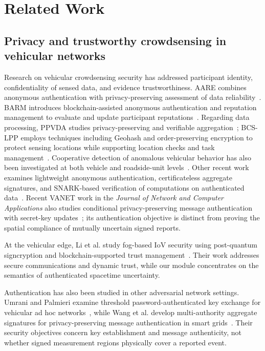 \section{Related Work}
\subsection{Privacy and trustworthy crowdsensing in vehicular networks}
Research on vehicular crowdsensing security has addressed participant identity, confidentiality of sensed data, and evidence trustworthiness. AARE combines anonymous authentication with privacy-preserving assessment of data reliability~\citep{Cheng2023}. BARM introduces blockchain-assisted anonymous authentication and reputation management to evaluate and update participant reputations~\citep{Zheng2025BARM}. Regarding data processing, PPVDA studies privacy-preserving and verifiable aggregation~\citep{Zhou2024}; BCS-LPP employs techniques including Geohash and order-preserving encryption to protect sensing locations while supporting location checks and task management~\citep{Shen2024}. Cooperative detection of anomalous vehicular behavior has also been investigated at both vehicle and roadside-unit levels~\citep{Sultana2024}. Other recent work examines lightweight anonymous authentication, certificateless aggregate signatures, and SNARK-based verification of computations on authenticated data~\citep{Imam2025JISA,Wang2025JISA,Reinhart2026ADSC}. Recent VANET work in the \emph{Journal of Network and Computer Applications} also studies conditional privacy-preserving message authentication with secret-key updates~\citep{JNCaFan2026}; its authentication objective is distinct from proving the spatial compliance of mutually uncertain signed reports.

At the vehicular edge, Li et al. study fog-based IoV security using post-quantum signcryption and blockchain-supported trust management~\citep{JNCaLi2025}. Their work addresses secure communications and dynamic trust, while our module concentrates on the semantics of authenticated spacetime uncertainty.

Authentication has also been studied in other adversarial network settings. Umrani and Palmieri examine threshold password-authenticated key exchange for vehicular ad hoc networks~\citep{CybersecUmrani2025}, while Wang et al. develop multi-authority aggregate signatures for privacy-preserving message authentication in smart grids~\citep{CybersecWang2026}. Their security objectives concern key establishment and message authenticity, not whether signed measurement regions physically cover a reported event.

